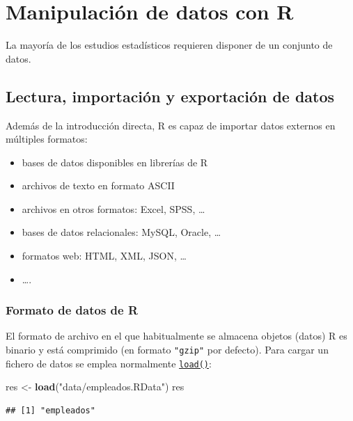 \documentclass[]{book}
\newenvironment{Shaded}{\begin{snugshade}}{\end{snugshade}}
\newcommand{\KeywordTok}[1]{\textcolor[rgb]{0.13,0.29,0.53}{\textbf{#1}}}
\newcommand{\StringTok}[1]{\textcolor[rgb]{0.31,0.60,0.02}{#1}}
\newcommand{\NormalTok}[1]{#1}
\begin{document}
\chapter{Manipulación de datos con R}\label{manipulacion-de-datos-con-r}

La mayoría de los estudios estadísticos requieren disponer de un
conjunto de datos.

\section{Lectura, importación y exportación de
datos}\label{lectura-importacion-y-exportacion-de-datos}

Además de la introducción directa, R es capaz de importar datos externos
en múltiples formatos:

\begin{itemize}
\item
  bases de datos disponibles en librerías de R
\item
  archivos de texto en formato ASCII
\item
  archivos en otros formatos: Excel, SPSS, \ldots{}
\item
  bases de datos relacionales: MySQL, Oracle, \ldots{}
\item
  formatos web: HTML, XML, JSON, \ldots{}
\item
  \ldots{}.
\end{itemize}

\subsection{Formato de datos de R}\label{formato-de-datos-de-r}

El formato de archivo en el que habitualmente se almacena objetos
(datos) R es binario y está comprimido (en formato \texttt{"gzip"} por
defecto). Para cargar un fichero de datos se emplea normalmente
\href{https://www.rdocumentation.org/packages/base/versions/3.6.1/topics/load}{\texttt{load()}}:

\begin{Shaded}
\begin{Highlighting}[]
\NormalTok{res <-}\StringTok{ }\KeywordTok{load}\NormalTok{(}\StringTok{"data/empleados.RData"}\NormalTok{)}
\NormalTok{res}
\end{Highlighting}
\end{Shaded}

\begin{verbatim}
## [1] "empleados"
\end{verbatim}
\end{document}
